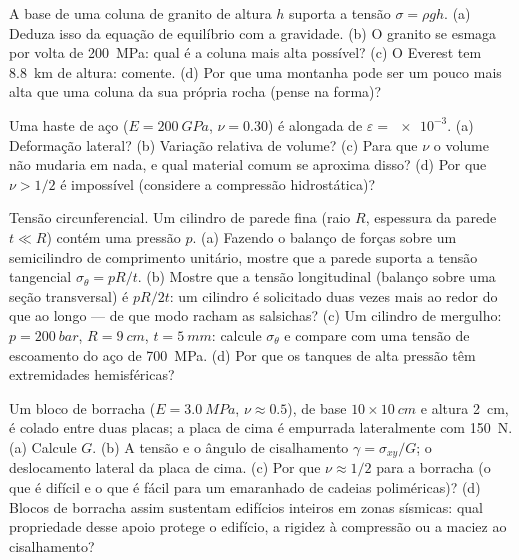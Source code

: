 \begin{exercise}[$\star$]\label{exo:b3:continuum-elasticity:3}
A base de uma coluna de granito de altura $h$ suporta a tensão $\sigma
= \rho gh$. (a) Deduza isso da equação de equilíbrio com a gravidade.
(b) O granito se esmaga por volta de \qty{200}{MPa}: qual é a coluna
mais alta possível? (c) O Everest tem \qty{8.8}{km} de altura:
comente. (d) Por que uma montanha pode ser um pouco mais alta que uma
coluna da sua própria rocha (pense na forma)?
\end{exercise}

\begin{exercise}[$\star$]\label{exo:b3:continuum-elasticity:4}
Uma haste de aço ($E = \qty{200}{GPa}$, $\nu = 0.30$) é alongada de
$\varepsilon = \num{e-3}$. (a) Deformação lateral? (b) Variação
relativa de volume? (c) Para que $\nu$ o volume não mudaria em nada, e
qual material comum se aproxima disso? (d) Por que $\nu > 1/2$ é
impossível (considere a compressão hidrostática)?
\end{exercise}

\begin{exercise}[$\star\star$]\label{exo:b3:continuum-elasticity:5}
Tensão circunferencial. Um cilindro de parede fina (raio $R$,
espessura da parede $t \ll
R$) contém uma pressão $p$. (a) Fazendo o balanço de forças sobre um
semicilindro de comprimento unitário, mostre que a parede suporta a
tensão tangencial $\sigma_\theta = pR/t$. (b) Mostre que a tensão
longitudinal (balanço sobre uma seção transversal) é $pR/2t$: um
cilindro é solicitado duas vezes mais ao redor do que ao longo --- de
que modo racham as salsichas? (c) Um cilindro de mergulho: $p =
\qty{200}{bar}$, $R = \qty{9}{cm}$, $t = \qty{5}{mm}$: calcule
$\sigma_\theta$ e compare com uma tensão de escoamento do aço de
\qty{700}{MPa}. (d) Por que os tanques de alta pressão têm
extremidades hemisféricas?
\end{exercise}

\begin{exercise}[$\star\star$]\label{exo:b3:continuum-elasticity:6}
Um bloco de borracha ($E = \qty{3.0}{MPa}$, $\nu \approx 0.5$), de base $10
\times \qty{10}{cm}$ e altura \qty{2}{cm}, é colado entre duas placas;
a placa de cima é empurrada lateralmente com \qty{150}{N}. (a) Calcule
$G$. (b) A tensão e o ângulo de cisalhamento $\gamma = \sigma_{xy}/G$;
o deslocamento lateral da placa de cima. (c) Por que $\nu \approx 1/2$
para a borracha (o que é difícil e o que é fácil para um emaranhado de
cadeias poliméricas)? (d) Blocos de borracha assim sustentam edifícios
inteiros em zonas sísmicas: qual propriedade desse apoio protege o
edifício, a rigidez à compressão ou a maciez ao cisalhamento?
\end{exercise}


